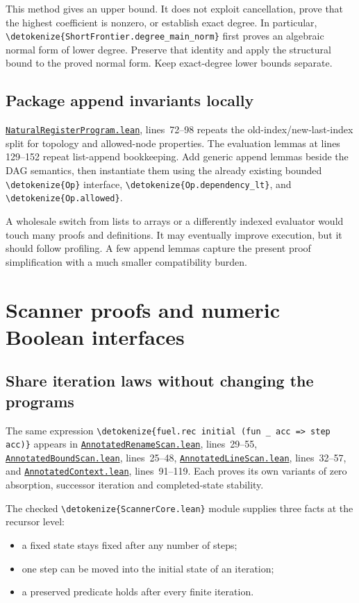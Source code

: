 \documentclass[11pt,letterpaper]{article}
\newcommand{\code}[1]{\expandafter\nolinkurl\expandafter{\detokenize{#1}}}
\newcommand{\repo}{https://github.com/VladimirReshetnikov/ProveIt/blob/60e9c5d620c6c387d932876cfa2d9376f64ea56c}
\newcommand{\src}[2]{\href{\repo/Computability/DiophantineConsistency/Lean/DiophantineConsistency/#1.lean}{\nolinkurl{#1.lean}}, lines~#2}
\begin{document}
This method gives an upper bound. It does not exploit cancellation, prove that the highest coefficient is nonzero, or establish exact degree. In particular, \code{ShortFrontier.degree_main_norm} first proves an algebraic normal form of lower degree. Preserve that identity and apply the structural bound to the proved normal form. Keep exact-degree lower bounds separate.

\subsection{Package append invariants locally}

\src{NaturalRegisterProgram}{72--98} repeats the old-index/new-last-index split for topology and allowed-node properties. The evaluation lemmas at lines 129--152 repeat list-append bookkeeping. Add generic append lemmas beside the DAG semantics, then instantiate them using the already existing bounded \code{Op} interface, \code{Op.dependency_lt}, and \code{Op.allowed}.

A wholesale switch from lists to arrays or a differently indexed evaluator would touch many proofs and definitions. It may eventually improve execution, but it should follow profiling. A few append lemmas capture the present proof simplification with a much smaller compatibility burden.

\section{Scanner proofs and numeric Boolean interfaces}

\subsection{Share iteration laws without changing the programs}

The same expression \code{fuel.rec initial (fun _ acc => step acc)} appears in \src{AnnotatedRenameScan}{29--55}, \src{AnnotatedBoundScan}{25--48}, \src{AnnotatedLineScan}{32--57}, and \src{AnnotatedContext}{91--119}. Each proves its own variants of zero absorption, successor iteration and completed-state stability.

The checked \code{ScannerCore.lean} module supplies three facts at the recursor level:

\begin{itemize}
\item a fixed state stays fixed after any number of steps;
\item one step can be moved into the initial state of an iteration;
\item a preserved predicate holds after every finite iteration.
\end{itemize}
\end{document}

